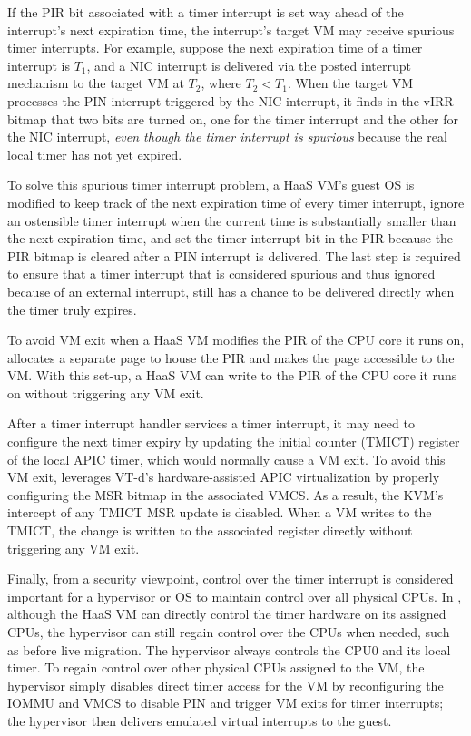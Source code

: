 If the PIR bit associated with a timer interrupt is set way ahead of the interrupt's next expiration time,
the interrupt's target VM may receive spurious timer interrupts.
For example, suppose the next expiration time of a timer interrupt is $T_1$, and a NIC interrupt is delivered via the posted interrupt mechanism to the target VM at $T_2$, where ${T_2} < {T_1}$.
When the target  VM processes the PIN interrupt triggered by the NIC interrupt, it finds in the vIRR bitmap that two bits are turned on, one for the timer interrupt and the other for the NIC
interrupt, {\em even though the timer interrupt is spurious} because the real local timer has not yet expired.

To solve this spurious timer interrupt problem, a HaaS VM's guest OS is modified to keep track of the next expiration time of every timer interrupt, ignore an ostensible timer interrupt when
the current time is substantially smaller than the next expiration time,
and set the timer interrupt bit in the PIR because the PIR bitmap is cleared
after a PIN interrupt is delivered.
The last step is required to ensure that a timer interrupt that is considered spurious and thus ignored because of an external interrupt,  still has a chance to be delivered directly when the timer truly expires.

To avoid VM exit when a HaaS VM modifies the PIR of the CPU core it runs on,
\na allocates a separate page to house the PIR and makes the page accessible to the VM.
With this set-up, a HaaS VM can write to the PIR of the CPU core it runs on without triggering any VM exit.

After a timer interrupt handler services a timer interrupt, it may need to configure the next timer expiry by updating the initial counter (TMICT) register of the local APIC timer,
which would normally cause a VM exit. To avoid this VM exit, \na leverages VT-d's hardware-assisted APIC virtualization by properly configuring the MSR bitmap in the associated VMCS.
As a result, the KVM's  intercept of any TMICT MSR update is disabled. When a VM writes to the TMICT, the change is written to the associated register directly without triggering any VM exit.

Finally, from a security viewpoint, control over the timer interrupt is considered important for a hypervisor or OS to maintain control over all physical CPUs.
In \na, although the HaaS VM can directly control the timer hardware on its assigned CPUs, the hypervisor can still regain
control over the CPUs when needed, such as before live migration.
The hypervisor always controls the CPU0 and its local timer.
To regain control over other physical CPUs assigned to the VM, the hypervisor
simply disables direct timer access for the VM by reconfiguring the IOMMU and VMCS to
disable PIN and trigger VM exits for timer interrupts; the hypervisor then delivers
emulated virtual interrupts to the guest.

